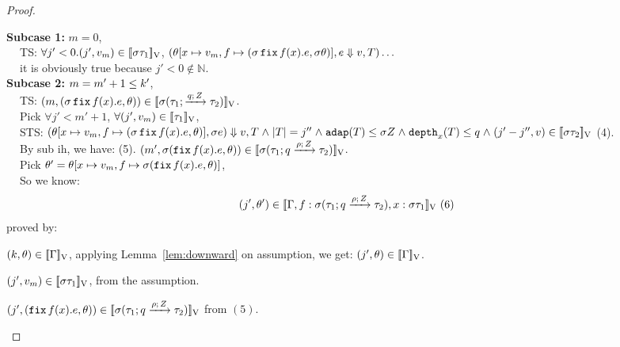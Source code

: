 \begin{proof}
\begin{mainitem}
{\bf Subcase 1:} $m = 0$,\\
	$~~~~$ TS: $\forall j' < 0. (j', v_m ) \in [\![ \sigma
          \tau_1 ]\!]_{\text{V}}$, $ (\theta[x \mapsto v_m, f \mapsto (\sigma \mathop{\mathtt{fix}}
        f(x).e, \sigma \theta)], e \mathrel{\Downarrow} v, T ) \dots $\\
	$~~~~$ it is obviously true because $j' < 0 \notin \mathbb{N}$.\\
{\bf Subcase 2:} $m = m' + 1 \leq k'$,\\
	$~~~~$ TS: $ (m, (\sigma \mathop{\mathtt{fix}} f(x). e, \theta)) \in [\![  \sigma (\tau_1;   \xrightarrow{q ; \, Z} \tau_2)  ]\!]_{\text{V}}$.\\
	$~~~~$ Pick $\forall j' < m' + 1$, $\forall (j', v_m) \in [\![ \tau_1 ]\!]_{\text{V}}$,\\

	$~~~~$ STS: $ (\theta[x \mapsto v_m, f \mapsto (\sigma \mathop{\mathtt{fix}}
        f(x).e, \theta)], \sigma e) \mathrel{\Downarrow} v, T \mathrel{\wedge}
        |T| = j'' \mathrel{\wedge}
        \mathtt{adap}(T) \leq \sigma Z \mathrel{\wedge} \mathtt{depth}_{x}(T) \leq q
        \mathrel{\wedge} (j' - j'', v) \in [\![ \sigma \tau_2 ]\!]_{\text{V}}$ (4).\\

	$~~~~$ By sub ih, we have:
	(5). $(m', \sigma( \mathop{\mathtt{fix}} f(x). e, \theta)) \in [\![ \sigma (\tau_1; q \xrightarrow{\rho; \, Z} \tau_2) ]\!]_{\text{V}}$.\\
	$~~~~$ Pick $\theta' = \theta[x \mapsto v_m, f \mapsto \sigma ( \mathop{\mathtt{fix}} f(x).e, \theta)]$,\\

	$~~~~$ So we know:  $$(j', \theta') \in [\![ \Gamma,
          f:\sigma (\tau_1; q \xrightarrow{\rho; \, Z} \tau_2),  x:
          \sigma  \tau_1 ]\!]_{\text{V}}~(6)$$ proved by:
    \begin{enumih}	
	\item $ (k, \theta) \in [\![ \Gamma ]\!]_{\text{V}}$, applying Lemma~\ref{lem:downward} on assumption, we get: $(j', \theta) \in [\![ \Gamma ]\!]_{\text{V}}$.
	
	\item $(j', v_m) \in [\![ \sigma \tau_1 ]\!]_{\text{V}}$, from the assumption.
	
	\item $(j', (\mathop{\mathtt{fix}} f(x). e, \theta)) \in [\![ \sigma (\tau_1; q \xrightarrow{\rho; \, Z} \tau_2) ]\!]_{\text{V}}$ from $(5)$.\\
	\end{enumih}


\end{mainitem}
\end{proof}
